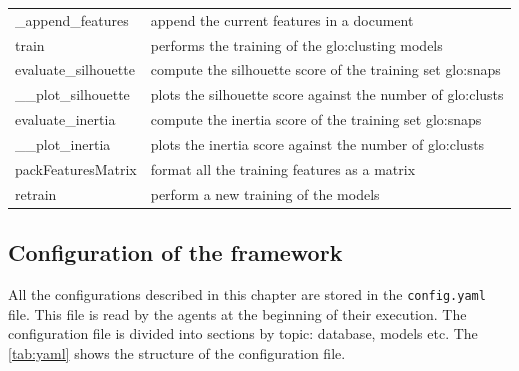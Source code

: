 \begin{longtable}{p{}p{}}
    \_append\_features & append the current features in a document \\
    train & performs the training of the \gls{glo:clust}ing models \\
    evaluate\_silhouette & compute the silhouette score of the training set \gls{glo:snap}s \\
    \_\_plot\_silhouette & plots the silhouette score against the number of \gls{glo:clust}s \\
    evaluate\_inertia & compute the inertia score of the training set \gls{glo:snap}s \\
    \_\_plot\_inertia & plots the inertia score against the number of \gls{glo:clust}s \\
    packFeaturesMatrix & format all the training features as a matrix \\
    retrain & perform a new training of the models \\
    \bottomrule
    \end{longtable}
    
\newpage
\subsection{Configuration of the framework}
All the configurations described in this chapter are stored in the \texttt{config.yaml} file. This file is read by the agents at the beginning of their execution. The configuration file is divided into sections by topic: database, models etc. The \autoref{tab:yaml} shows the structure of the configuration file.


